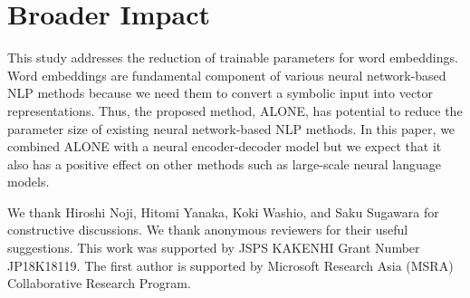 \documentclass{article}
\begin{document}
\section*{Broader Impact}
This study addresses the reduction of trainable parameters for word embeddings.
Word embeddings are fundamental component of various neural network-based NLP methods because we need them to convert a symbolic input into vector representations.
Thus, the proposed method, ALONE, has potential to reduce the parameter size of existing neural network-based NLP methods.
In this paper, we combined ALONE with a neural encoder-decoder model but we expect that it also has a positive effect on other methods such as large-scale neural language models.

\begin{ack}
We thank Hiroshi Noji, Hitomi Yanaka, Koki Washio, and Saku Sugawara for constructive discussions.
We thank anonymous reviewers for their useful suggestions.
This work was supported by JSPS KAKENHI Grant Number JP18K18119.
The first author is supported by Microsoft Research Asia (MSRA) Collaborative Research Program.
\end{ack}




\end{document}
